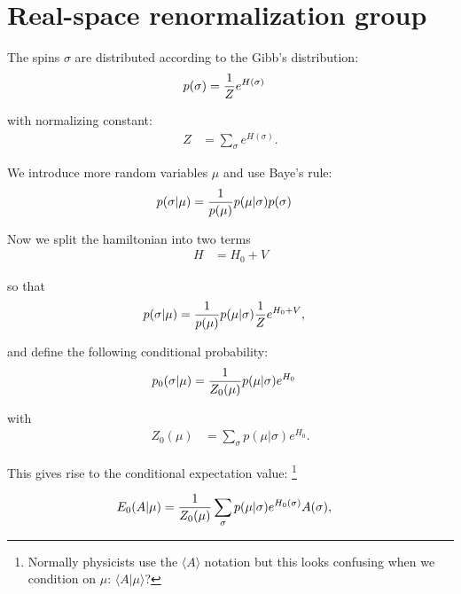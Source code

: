 \documentclass[11pt]{article}
\begin{document}
%
%

\section{Real-space renormalization group}


The spins $\sigma$ are distributed according
to the Gibb's distribution:
\begin{align*}
p(\sigma) &= {{1} \over {Z}}e^{H(\sigma)}
\end{align*}

with normalizing constant:
\begin{align*}
Z &= \sum_{\sigma} e^{H(\sigma)}.
\end{align*}

We introduce more random variables $\mu$ and
use Baye's rule:
\begin{align*}
p(\sigma | \mu) &= {{1} \over {p(\mu)}}p(\mu | \sigma)p(\sigma)
\end{align*}

Now we split the hamiltonian into two terms
\begin{align*}
H &= H_{0}+V
\end{align*}

so that
\begin{align*}
p(\sigma | \mu) &= {{1} \over {p(\mu)}}p(\mu | \sigma){{1} \over {Z}}e^{H_{0}+V},
\end{align*}

and define the following conditional probability:
\begin{align*}
p_{0}(\sigma | \mu) &= {{1} \over {Z_{0}(\mu)}}p(\mu | \sigma)e^{H_{0}}
\end{align*}

with
\begin{align*}
Z_{0}(\mu) &= \sum_{\sigma} p(\mu | \sigma)e^{H_{0}}.
\end{align*}

This gives rise to the conditional expectation value:
\footnote{Normally physicists use the $\langle A\rangle$ notation
but this looks confusing when we condition on
$\mu$: $\langle A|\mu\rangle$?}

\begin{align*}
E_{0}(A | \mu) &= {{1} \over {Z_{0}(\mu)}}\sum_{\sigma} p(\mu | \sigma)e^{H_{0}(\sigma)}A(\sigma),
\end{align*}
\end{document}
